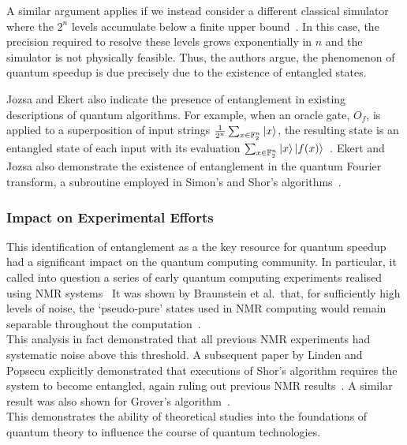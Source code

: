 \documentclass{standalone}
\begin{document}
A similar argument applies if we instead consider a different classical simulator where the $2^{n}$ levels accumulate below a finite upper bound~\cite{Jozsa2003}. In this case, the precision required to resolve these levels grows exponentially in $n$ and the simulator is not physically feasible. Thus, the authors argue, the phenomenon of quantum speedup is due precisely due to the existence of entangled states.  
\par
Jozsa and Ekert also indicate the presence of entanglement in existing descriptions of quantum algorithms. For example, when an oracle gate, $O_{f}$, is applied to a superposition of input strings $\frac{1}{2^{n}}\sum_{x\in\mathbb{F}_{2}^{n}}\ket{x}$, the resulting state is an entangled state of each input with its evaluation $\sum_{x\in\mathbb{F}_{2}^{n}}\ket{x}\ket{f(x)}$~\cite{Jozsa1997}. Ekert and Jozsa also demonstrate the existence of entanglement in the quantum Fourier transform, a subroutine employed in Simon's and Shor's algorithms~\cite{Ekert1998}.

\subsubsection*{Impact on Experimental Efforts}
This identification of entanglement as a the key resource for quantum speedup had a significant impact on the quantum computing community. In particular, it called into question a series of early quantum computing experiments realised using NMR systems~\cite{Braunstein1999,Linden2001} It was shown by Braunstein et al.\ that, for sufficiently high levels of noise, the `pseudo-pure' states used in NMR computing would remain separable throughout the computation~\cite{Braunstein1999}. \\
This analysis in fact demonstrated that all previous NMR experiments had systematic noise above this threshold. A subsequent paper by Linden and Popsecu explicitly demonstrated that executions of Shor's algorithm requires the system to become entangled, again ruling out previous NMR results~\cite{Linden2001}. A similar result was also shown for Grover's algorithm~\cite{Braunstein2001}.\\
This demonstrates the ability of theoretical studies into the foundations of quantum theory to influence the course of quantum technologies.
\end{document}
